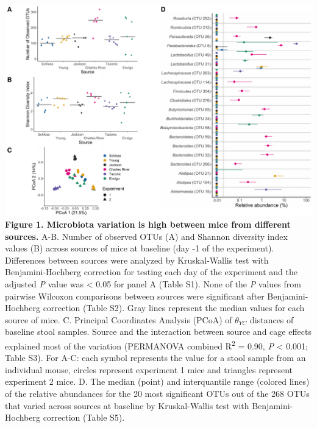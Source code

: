 \documentclass[
  11pt,
]{article}
\begin{document}
\includegraphics{figure_1.pdf} \textbf{Figure 1. Microbiota variation is
high between mice from different sources.} A-B. Number of observed OTUs
(A) and Shannon diversity index values (B) across sources of mice at
baseline (day -1 of the experiment). Differences between sources were
analyzed by Kruskal-Wallis test with Benjamini-Hochberg correction for
testing each day of the experiment and the adjusted \emph{P} value was
\textless{} 0.05 for panel A (Table S1). None of the \emph{P} values
from pairwise Wilcoxon comparisons between sources were significant
after Benjamini-Hochberg correction (Table S2). Gray lines represent the
median values for each source of mice. C. Principal Coordinates Analysis
(PCoA) of \(\theta_{YC}\) distances of baseline stool samples. Source
and the interaction between source and cage effects explained most of
the variation (PERMANOVA combined R\textsuperscript{2} = 0.90, \emph{P}
\textless{} 0.001; Table S3). For A-C: each symbol represents the value
for a stool sample from an individual mouse, circles represent
experiment 1 mice and triangles represent experiment 2 mice. D. The
median (point) and interquantile range (colored lines) of the relative
abundances for the 20 most significant OTUs out of the 268 OTUs that
varied across sources at baseline by Kruskal-Wallis test with
Benjamini-Hochberg correction (Table S5).

\newpage
\end{document}
